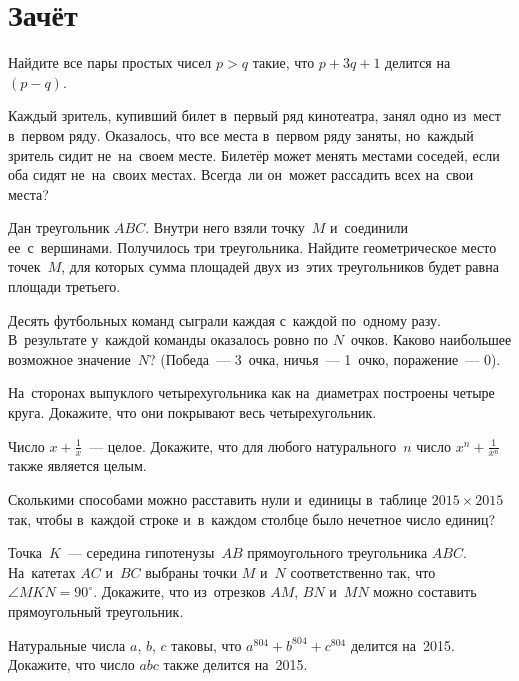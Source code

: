 
\section*{Зачёт}


\begin{problems}

\item
Найдите все пары простых чисел $p > q$ такие, что $p + 3 q + 1$ делится
на~$(p - q)$.

\item
Каждый зритель, купивший билет в~первый ряд кинотеатра, занял одно из~мест
в~первом ряду.
Оказалось, что все места в~первом ряду заняты, но~каждый зритель сидит
не~на~своем месте.
Билетёр может менять местами соседей, если оба сидят не~на~своих местах.
Всегда~ли он~может рассадить всех на~свои места?

\item
Дан треугольник $ABC$.
Внутри него взяли точку~$M$ и~соединили ее~с~вершинами.
Получилось три треугольника.
Найдите геометрическое место точек~$M$, для которых сумма площадей двух из~этих
треугольников будет равна площади третьего.

\item
Десять футбольных команд сыграли каждая с~каждой по~одному разу.
В~результате у~каждой команды оказалось ровно по $N$~очков.
Каково наибольшее возможное значение~$N$?
(Победа~--- 3~очка, ничья~--- 1~очко, поражение~--- 0).

\item
На~сторонах выпуклого четырехугольника как на~диаметрах построены четыре круга.
Докажите, что они покрывают весь четырехугольник.

\item
Число $x + \frac{1}{x}$~--- целое.
Докажите, что для любого натурального~$n$ число $x^n + \frac{1}{x^n}$ также
является целым.

\item
Сколькими способами можно расставить нули и~единицы в~таблице
$2015 \times 2015$ так, чтобы в~каждой строке и~в~каждом столбце было нечетное
число единиц?

\item
Точка~$K$~--- середина гипотенузы~$AB$ прямоугольного треугольника $ABC$.
На~катетах $AC$ и~$BC$ выбраны точки $M$ и~$N$ соответственно так, что
$\angle MKN = 90^{\circ}$.
Докажите, что из~отрезков $AM$, $BN$ и~$MN$ можно составить прямоугольный
треугольник.

\item
Натуральные числа $a$, $b$, $c$ таковы, что $a^{804} + b^{804} + c^{804}$
делится на~2015.
Докажите, что число $a b c$ также делится на~2015.

\end{problems}

